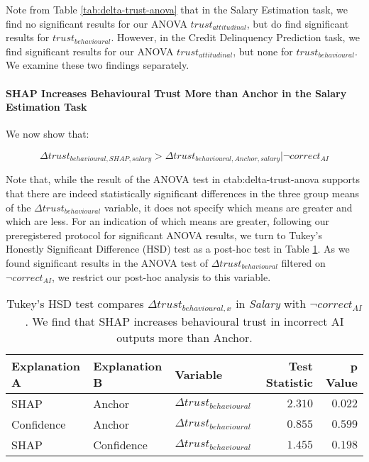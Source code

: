 Note from Table \ref{tab:delta-trust-anova} that in the Salary Estimation task, we find no significant results for our ANOVA $trust_{attitudinal}$, but do find significant results for $trust_{behavioural}$. However, in the Credit Delinquency Prediction task, we find significant results for our ANOVA $trust_{attitudinal}$, but none for $trust_{behavioural}$. We examine these two findings separately.

\paragraph{SHAP Increases Behavioural Trust More than Anchor in the Salary Estimation Task}
We now show that:

\begin{equation}
    \Delta trust_{behavioural,SHAP,salary} > \Delta trust_{behavioural,Anchor,salary} | \neg correct_{AI}
\end{equation}

\noindent Note that, while the result of the ANOVA test in c{tab:delta-trust-anova} supports that there are indeed statistically significant differences in the three group means of the $\Delta trust_{behavioural}$ variable, it does not specify which means are greater and which are less. For an indication of which means are greater, following our preregistered protocol for significant ANOVA results, we turn to Tukey's Honestly Significant Difference (HSD) test as a post-hoc test in Table \ref{tab:delta-trust-hsd}. As we found significant results in the ANOVA test of $\Delta trust_{behavioural}$ filtered on $\neg correct_{AI}$, we restrict our post-hoc analysis to this variable.

\begin{table}[htb]
    \centering
    \caption{Tukey's HSD test compares $\Delta trust_{behavioural,x}$ in \emph{Salary} with $\neg correct_{AI}$. We find that SHAP increases behavioural trust in incorrect AI outputs more than Anchor.}
    \label{tab:delta-trust-hsd}
    \begin{tabular}{lllrr}
        \toprule
        Explanation A & Explanation B & Variable & Test Statistic & p Value \\
        \midrule
        SHAP & Anchor & $\Delta trust_{behavioural}$ & $\mathbf{2.310}$ & $\mathbf{0.022}$ \\
        Confidence & Anchor & $\Delta trust_{behavioural}$ & $0.855$ & $0.599$ \\
        SHAP & Confidence & $\Delta trust_{behavioural}$ & $1.455$ & $0.198$ \\
        \bottomrule
    \end{tabular}
\end{table}


